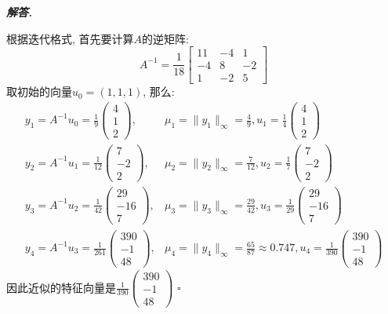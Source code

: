 \documentclass[10pt, a4paper, oneside]{ctexart}
\newcommand{\norm}[1]{\| #1 \|}
\newenvironment{solution}{%
  \par\noindent\textbf{\textit{解答. }}\ignorespaces
}{%
  \hfill\ensuremath{\square}\par %
}
\begin{document}
\begin{solution}
根据迭代格式, 首先要计算$A$的逆矩阵:
$$A^{-1}=\frac{1}{18}\begin{bmatrix}
    11&-4&1\\
    -4&8&-2\\
    1&-2&5
\end{bmatrix}$$
取初始的向量$u_0=(1,1,1)$, 那么:
\begin{align*}
    y_1=A^{-1}u_0=\frac{1}{9}\begin{pmatrix}
        4\\1\\2
    \end{pmatrix}, & \mu_1=\norm{y_1}_{\infty}=\frac{4}{9}, u_1=\frac{1}{4}\begin{pmatrix}
        4\\1\\2
    \end{pmatrix}\\
    y_2=A^{-1}u_1=\frac{1}{12}\begin{pmatrix}
        7\\-2\\2
    \end{pmatrix}, & \mu_2=\norm{y_2}_{\infty}=\frac{7}{12}, u_2=\frac{1}{7}\begin{pmatrix}
        7\\-2\\2
    \end{pmatrix}\\
    y_3=A^{-1}u_2=\frac{1}{42}\begin{pmatrix}
        29\\-16\\7
    \end{pmatrix}, & \mu_3=\norm{y_3}_{\infty}=\frac{29}{42}, u_3=\frac{1}{29}\begin{pmatrix}
        29\\-16\\7
    \end{pmatrix}\\
    y_4=A^{-1}u_3=\frac{1}{261}\begin{pmatrix}
        390\\-1\\48
    \end{pmatrix}, & \mu_4=\norm{y_4}_{\infty}=\frac{65}{87}\approx 0.747, u_4=\frac{1}{390}\begin{pmatrix}
        390\\-1\\48
    \end{pmatrix}
\end{align*}
因此近似的特征向量是$\frac{1}{390}\begin{pmatrix}
    390\\-1\\48
\end{pmatrix}$
\end{solution}
\end{document}
